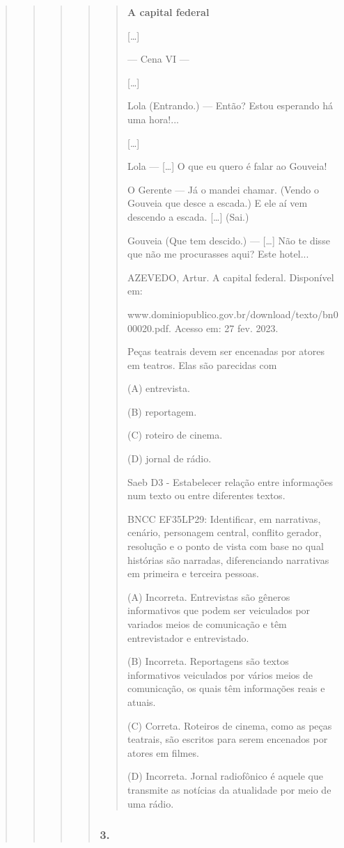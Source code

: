 \begin{quote}
\begin{quote}
\begin{quote}
\begin{quote}
\begin{quote}
\textbf{A capital federal}

{[}\ldots{}{]}

--- Cena VI ---

{[}\ldots{}{]}

Lola (Entrando.) --- Então? Estou esperando há uma hora!...

{[}\ldots{}{]}

Lola --- {[}\ldots{}{]} O que eu quero é falar ao Gouveia!

O Gerente --- Já o mandei chamar. (Vendo o Gouveia que desce a escada.)
E ele aí vem descendo a escada. {[}\ldots{}{]} (Sai.)

Gouveia (Que tem descido.) --- {[}\ldots{}{]} Não te disse que não me
procurasses aqui? Este hotel...

AZEVEDO, Artur. A capital federal. Disponível em:

www.dominiopublico.gov.br/download/texto/bn000020.pdf. Acesso em: 27
fev. 2023.

Peças teatrais devem ser encenadas por atores em teatros. Elas são
parecidas com

(A) entrevista.

(B) reportagem.

(C) roteiro de cinema.

(D) jornal de rádio.

Saeb D3 - Estabelecer relação entre informações num texto ou entre
diferentes textos.

BNCC EF35LP29: Identificar, em narrativas, cenário, personagem central,
conflito gerador, resolução e o ponto de vista com base no qual
histórias são narradas, diferenciando narrativas em primeira e terceira
pessoas.

(A) Incorreta. Entrevistas são gêneros informativos que podem ser
veiculados por variados meios de comunicação e têm entrevistador e
entrevistado.

(B) Incorreta. Reportagens são textos informativos veiculados por vários
meios de comunicação, os quais têm informações reais e atuais.

(C) Correta. Roteiros de cinema, como as peças teatrais, são escritos
para serem encenados por atores em filmes.

(D) Incorreta. Jornal radiofônico é aquele que transmite as notícias da
atualidade por meio de uma rádio.
\end{quote}

\subsubsection{3. }\label{section-86}


\end{quote}
\end{quote}
\end{quote}
\end{quote}
